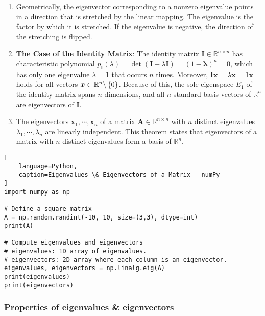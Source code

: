 \begin{enumerate}
    \item Geometrically, the eigenvector corresponding to a nonzero eigenvalue points in a direction that is stretched by the linear mapping.
    The eigenvalue is the factor by which it is stretched. 
    If the eigenvalue is negative, the direction of the stretching is flipped.
    \hfill \cite{mfml/book/mml/Deisenroth-Faisal-Ong}

    \item \textbf{The Case of the Identity Matrix}: The identity matrix $\bm{I} \in \mathbb{R}^{n\times n}$ has characteristic polynomial $p_{\bm{I}} (\lambda ) = \det(\bm{I} -\lambda \bm{I}) = (1-\bm{\lambda }) ^n = 0$, which has only one eigenvalue $\lambda  = 1$ that occurs $n$ times. 
    Moreover, $\bm{Ix} = \lambda \bm{x} = 1\bm{x}$ holds for all vectors $\bm{x} \in \mathbb{R}^n\backslash \left\{0\right\}$. 
    Because of this, the sole eigenspace $E_1$ of the identity matrix spans $n$ dimensions, and all $n$ standard basis vectors of $\mathbb{R}^n$ are eigenvectors of $\bm{I}$.
    \hfill \cite{mfml/book/mml/Deisenroth-Faisal-Ong}

    \item 
    \begin{theorem}
        The eigenvectors $\bm{x}_1, \cdots , \bm{x}_n$ of a matrix $\bm{A} \in \mathbb{R}^{n\times n}$ with $n$ distinct eigenvalues $\lambda _1, \cdots , \lambda _n$ are linearly independent.
        This theorem states that eigenvectors of a matrix with $n$ distinct eigenvalues form a basis of $\mathbb{R}^n$.
        \hfill \cite{mfml/book/mml/Deisenroth-Faisal-Ong}
    \end{theorem}

\end{enumerate}




\begin{lstlisting}[
    language=Python,
    caption=Eigenvalues \& Eigenvectors of a Matrix - numPy
]
import numpy as np

# Define a square matrix
A = np.random.randint(-10, 10, size=(3,3), dtype=int)
print(A)

# Compute eigenvalues and eigenvectors
# eigenvalues: 1D array of eigenvalues.
# eigenvectors: 2D array where each column is an eigenvector.
eigenvalues, eigenvectors = np.linalg.eig(A)
print(eigenvalues)
print(eigenvectors)
\end{lstlisting}



\subsubsection{Properties of eigenvalues \& eigenvectors}

